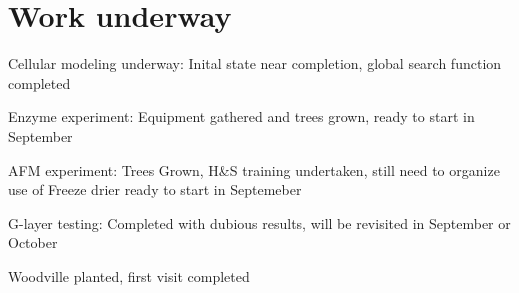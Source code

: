 \section{Work underway}
Cellular modeling underway:
Inital state near completion, global search function completed

Enzyme experiment: 
Equipment gathered and trees grown, ready to start in September

AFM experiment:
Trees Grown, H&S training undertaken, still need to organize use of Freeze drier
ready to start in Septemeber

G-layer testing:
Completed with dubious results, will be revisited in September or October

Woodville planted, first visit completed

  
  